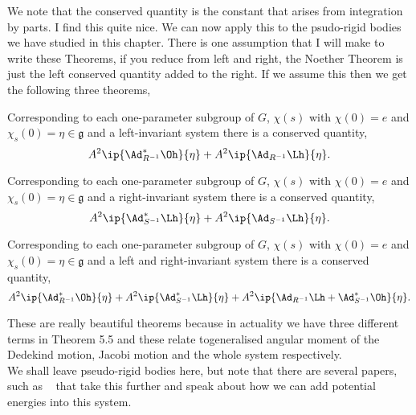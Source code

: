 \noindent
We note that the conserved quantity is the constant that arises from integration by parts. I find this quite nice. We can now apply this to the psudo-rigid bodies we have studied in this chapter. There is one assumption that I will make to write these Theorems, if you reduce from left and right, the Noether Theorem is just the left conserved quantity added to the right. If we assume this then we get the following three theorems,
\begin{nthm}
  Corresponding to each one-parameter subgroup of $G$, $\chi(s)$ with $\chi(0) = e$ and $\chi_s(0) = \eta \in \mathfrak{g}$ and a left-invariant system there is a conserved quantity,
  $$ A^2\ip{\Ad_{R^{-1}}^* \Oh}{\eta} + A^2\ip{\Ad_{R^{-1}}\Lh}{\eta}. $$
\end{nthm}
\begin{nthm}
  Corresponding to each one-parameter subgroup of $G$, $\chi(s)$ with $\chi(0) = e$ and $\chi_s(0) = \eta \in \mathfrak{g}$ and a right-invariant system there is a conserved quantity,
  $$ A^2\ip{\Ad_{S^{-1}}^* \Lh}{\eta} + A^2\ip{\Ad_{S^{-1}}\Lh}{\eta}. $$
\end{nthm}
\begin{nthm}
  Corresponding to each one-parameter subgroup of $G$, $\chi(s)$ with $\chi(0) = e$ and $\chi_s(0) = \eta \in \mathfrak{g}$ and a left and right-invariant system there is a conserved quantity,
  $$ A^2\ip{\Ad_{R^{-1}}^* \Oh}{\eta} + A^2\ip{\Ad_{S^{-1}}^* \Lh}{\eta} + A^2\ip{\Ad_{R^{-1}}\Lh + \Ad_{S^{-1}}^*\Oh }{\eta}. $$
\end{nthm}
\noindent
These are really beautiful theorems because in actuality we have three different terms in Theorem 5.5 and these relate togeneralised angular moment of the Dedekind motion, Jacobi motion and the whole system respectively.\\

We shall leave pseudo-rigid bodies here, but note that there are several papers, such as ~\cite{Iwai_2010} that take this further and speak about how we can add potential energies into this system.